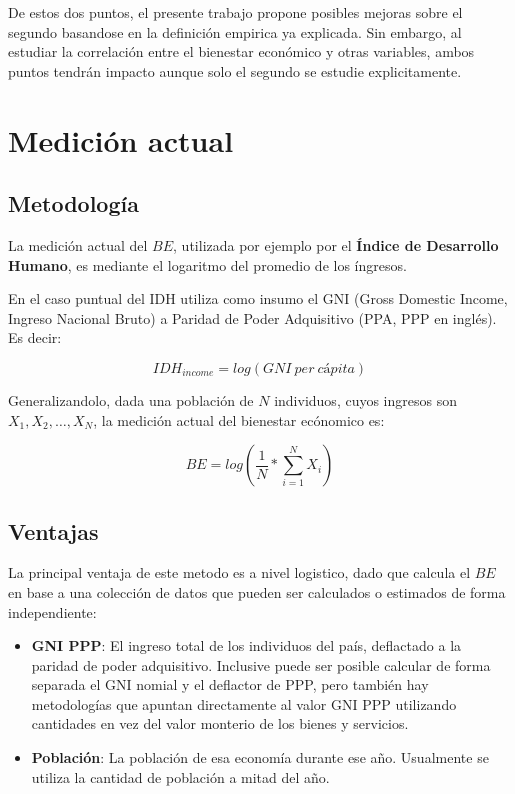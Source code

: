 \documentclass[11pt,a4paper]{tesis}
\begin{document}
De estos dos puntos, el presente trabajo propone posibles mejoras sobre el segundo basandose en la definición empirica ya explicada. Sin embargo, al estudiar la correlación entre el bienestar económico y otras variables, ambos puntos tendrán impacto aunque solo el segundo se estudie explicitamente.

\section{Medición actual}

\subsection{Metodología}

La medición actual del $BE$, utilizada por ejemplo por el \textbf{Índice de Desarrollo Humano}, es mediante el logaritmo del promedio de los íngresos.

En el caso puntual del IDH utiliza como insumo el GNI (Gross Domestic Income, Ingreso Nacional Bruto) a Paridad de Poder Adquisitivo (PPA, PPP en inglés). Es decir:

$$
IDH_{income} = log(GNI\ per\ cápita)
$$

Generalizandolo, dada una población de $N$ individuos, cuyos ingresos son $X_1, X_2, \dots, X_N$, la medición actual del bienestar ecónomico es:

$$
    BE = log(\frac{1}{N} * \sum_{i=1}^{N}X_i)
$$

\subsection{Ventajas}

La principal ventaja de este metodo es a nivel logistico, dado que calcula el $BE$ en base a una colección de datos que pueden ser calculados o estimados de forma independiente:

\begin{itemize}
    \item \textbf{GNI PPP}: El ingreso total de los individuos del país, deflactado a la paridad de poder adquisitivo. Inclusive puede ser posible calcular de forma separada el GNI nomial y el deflactor de PPP, pero también hay metodologías que apuntan directamente al valor GNI PPP utilizando cantidades en vez del valor monterio de los bienes y servicios. 
    \item \textbf{Población}: La población de esa economía durante ese año. Usualmente se utiliza la cantidad de población a mitad del año.
\end{itemize}
\end{document}
